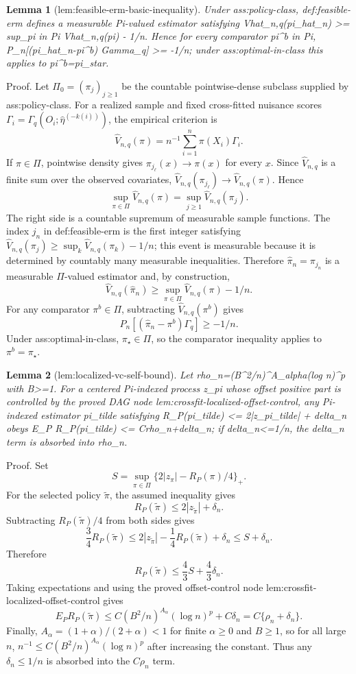\documentclass{article}
\newtheorem{lemma}{Lemma}
\begin{document}
\begin{lemma}[lem:feasible-erm-basic-inequality]\label{lem:feasible-erm-basic-inequality}
Under ass:policy-class, def:feasible-erm defines a measurable Pi-valued estimator satisfying Vhat_{n,q}(pi_hat_n) >= sup_{pi in Pi} Vhat_{n,q}(pi) - 1/n. Hence for every comparator pi^b in Pi, P_n[(pi_hat_n-pi^b) Gamma_q] >= -1/n; under ass:optimal-in-class this applies to pi^b=pi_star.
\end{lemma}
Proof. Let \(\Pi_0=(\pi_j)_{j\ge1}\) be the countable pointwise-dense subclass supplied by ass:policy-class. For a realized sample and fixed cross-fitted nuisance scores \(\Gamma_i=\Gamma_q(O_i;\widehat\eta^{(-k(i))})\), the empirical criterion is
\[
\widehat V_{n,q}(\pi)=n^{-1}\sum_{i=1}^n \pi(X_i)\Gamma_i .
\]
If \(\pi\in\Pi\), pointwise density gives \(\pi_{j_\ell}(x)\to\pi(x)\) for every \(x\). Since \(\widehat V_{n,q}\) is a finite sum over the observed covariates, \(\widehat V_{n,q}(\pi_{j_\ell})\to\widehat V_{n,q}(\pi)\). Hence
\[
\sup_{\pi\in\Pi}\widehat V_{n,q}(\pi)=\sup_{j\ge1}\widehat V_{n,q}(\pi_j).
\]
The right side is a countable supremum of measurable sample functions. The index \(j_n\) in def:feasible-erm is the first integer satisfying \(\widehat V_{n,q}(\pi_j)\ge \sup_k \widehat V_{n,q}(\pi_k)-1/n\); this event is measurable because it is determined by countably many measurable inequalities. Therefore \(\widehat\pi_n=\pi_{j_n}\) is a measurable \(\Pi\)-valued estimator and, by construction,
\[
\widehat V_{n,q}(\widehat\pi_n)\ge \sup_{\pi\in\Pi}\widehat V_{n,q}(\pi)-1/n.
\]
For any comparator \(\pi^b\in\Pi\), subtracting \(\widehat V_{n,q}(\pi^b)\) gives
\[
P_n[(\widehat\pi_n-\pi^b)\Gamma_q]\ge -1/n.
\]
Under ass:optimal-in-class, \(\pi_\star\in\Pi\), so the comparator inequality applies to \(\pi^b=\pi_\star\).

\begin{lemma}[lem:localized-vc-self-bound]\label{lem:localized-vc-self-bound}
Let rho_n=(B^2/n)^{A_alpha}(log n)^p with B>=1. For a centered Pi-indexed process z_pi whose offset positive part is controlled by the proved DAG node lem:crossfit-localized-offset-control, any Pi-indexed estimator pi_tilde satisfying R_P(pi_tilde) <= 2|z_{pi_tilde}| + delta_n obeys E_P R_P(pi_tilde) <= C{rho_n+delta_n}; if delta_n<=1/n, the delta_n term is absorbed into rho_n.
\end{lemma}
Proof. Set
\[
S=\sup_{\pi\in\Pi}\{2|z_\pi|-R_P(\pi)/4\}_+ .
\]
For the selected policy \(\widetilde\pi\), the assumed inequality gives
\[
R_P(\widetilde\pi)\le 2|z_{\widetilde\pi}|+\delta_n .
\]
Subtracting \(R_P(\widetilde\pi)/4\) from both sides gives
\[
\frac34R_P(\widetilde\pi)
\le 2|z_{\widetilde\pi}|-\frac14R_P(\widetilde\pi)+\delta_n
\le S+\delta_n .
\]
Therefore
\[
R_P(\widetilde\pi)\le \frac43S+\frac43\delta_n .
\]
Taking expectations and using the proved offset-control node lem:crossfit-localized-offset-control gives
\[
E_PR_P(\widetilde\pi)
\le C(B^2/n)^{A_\alpha}(\log n)^p+C\delta_n
=C\{\rho_n+\delta_n\}.
\]
Finally, \(A_\alpha=(1+\alpha)/(2+\alpha)<1\) for finite \(\alpha\ge0\) and \(B\ge1\), so for all large \(n\), \(n^{-1}\le C(B^2/n)^{A_\alpha}(\log n)^p\) after increasing the constant. Thus any \(\delta_n\le1/n\) is absorbed into the \(C\rho_n\) term.
\end{document}
